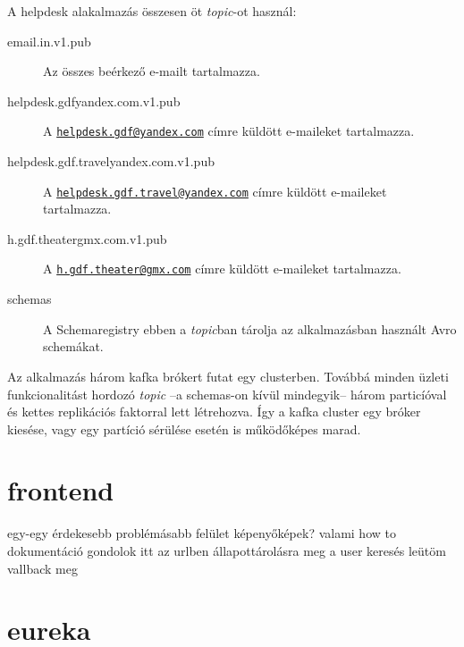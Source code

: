 A helpdesk alakalmazás összesen öt \textit{topic}-ot használ:
\begin{description}
	\item[email.in.v1.pub] Az összes beérkező  e-mailt tartalmazza.
	
	\item[helpdesk.gdf\textunderscore yandex.com.v1.pub] A  \href{mailto:helpdesk.gdf@yandex.com}{\nolinkurl{helpdesk.gdf@yandex.com}} címre küldött e-maileket tartalmazza.
	
	\item[helpdesk.gdf.travel\textunderscore yandex.com.v1.pub] A  \href{mailto:helpdesk.gdf.travel@yandex.com}{\nolinkurl{helpdesk.gdf.travel@yandex.com}} címre küldött e-maileket tartalmazza.
	
	
	\item[h.gdf.theater\textunderscore gmx.com.v1.pub] A \href{mailto:h.gdf.theater@gmx.com}{\nolinkurl{h.gdf.theater@gmx.com}} címre küldött e-maileket tartalmazza.
	
	\item[\textunderscore schemas] A Schemaregistry ebben a \textit{topic}ban tárolja az alkalmazásban használt Avro schemákat.
\end{description}


Az alkalmazás három kafka brókert futat egy clusterben. Továbbá minden üzleti funkcionalitást hordozó \textit{topic} --a \textunderscore schemas-on kívül mindegyik-- három particíóval és kettes replikációs faktorral lett létrehozva.
Így a kafka cluster egy bróker kiesése, vagy egy partíció sérülése esetén is működőképes marad.


\section{frontend}
egy-egy érdekesebb problémásabb felület
 képenyőképek? valami how to dokumentáció	
 gondolok itt az urlben állapottárolásra
 meg a user keresés leütöm vallback meg 


\section{eureka}

